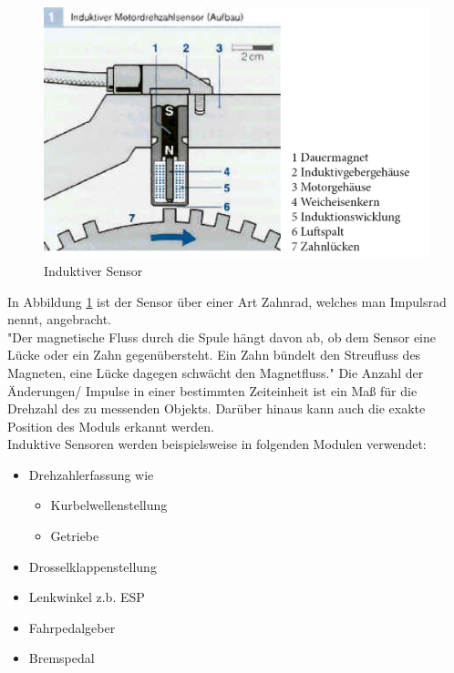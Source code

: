 			\begin{figure}[h]
				\centering
				\includegraphics{Induktiv_mit_legende.jpg}
				\caption[www.kfztech.de/kfztechnik/elo/sensoren/induktivgeber.htm]{Induktiver Sensor}
				\label{fig:TS03}
			\end{figure}
			
			In Abbildung \ref{fig:TS03} ist der Sensor über einer Art Zahnrad, welches man Impulsrad nennt, angebracht.\\
            
            "Der magnetische Fluss durch die Spule hängt davon ab, ob dem Sensor eine Lücke oder ein Zahn gegenübersteht. Ein Zahn bündelt den Streufluss des Magneten, eine Lücke dagegen schwächt den Magnetfluss." \cite{TS_ind_funkt}  
			Die Anzahl der Änderungen/ Impulse in einer bestimmten Zeiteinheit ist ein Maß für die Drehzahl des zu messenden Objekts. Darüber hinaus kann auch die exakte Position des Moduls erkannt werden.\\					
            
			Induktive Sensoren werden beispielsweise in folgenden Modulen verwendet:
			
			\begin{itemize}
				\item Drehzahlerfassung wie
					\begin{itemize}
						\item Kurbelwellenstellung
						\item Getriebe
					\end{itemize}	
				\item Drosselklappenstellung
				\item Lenkwinkel z.b. ESP
				\item Fahrpedalgeber
				\item Bremspedal
			\end{itemize}
		
